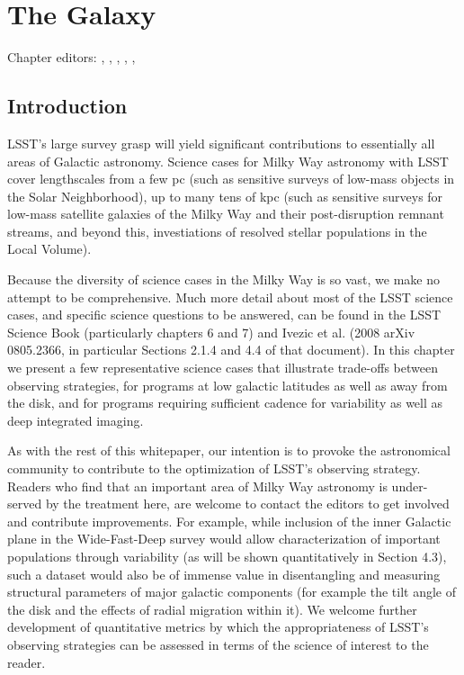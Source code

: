 
\chapter{The Galaxy}
\def\chpname{galaxy}\label{chp:\chpname}

Chapter editors:
,
,
,
,
,



\section{Introduction}
\def\secname{MW_Intro}\label{sec:\secname}

LSST's large survey grasp will yield significant contributions to
essentially all areas of Galactic astronomy. Science cases for Milky
Way astronomy with LSST cover lengthscales from a few pc (such as
sensitive surveys of low-mass objects in the Solar Neighborhood), up
to many tens of kpc (such as sensitive surveys for low-mass satellite
galaxies of the Milky Way and their post-disruption remnant streams,
and beyond this, investiations of resolved stellar populations in the
Local Volume). 

Because the diversity of science cases in the Milky Way is so vast, we
make no attempt to be comprehensive. Much more detail about most of
the LSST science cases, and specific science questions to be answered,
can be found in the LSST Science Book (particularly chapters 6 and 7)
and Ivezic et al. (2008 arXiv 0805.2366, in particular Sections 2.1.4
and 4.4 of that document). In this chapter we present a few
representative science cases that illustrate trade-offs between
observing strategies, for programs at low galactic latitudes as well
as away from the disk, and for programs requiring sufficient cadence
for variability as well as deep integrated imaging. 

As with the rest of this whitepaper, our intention is to provoke the
astronomical community to contribute to the optimization of LSST's
observing strategy. Readers who find that an important area of Milky
Way astronomy is under-served by the treatment here, are welcome to
contact the editors to get involved and contribute improvements. For
example, while inclusion of the inner Galactic plane in the
Wide-Fast-Deep survey would allow characterization of important
populations through variability (as will be shown quantitatively in
Section 4.3), such a dataset would also be of immense value in
disentangling and measuring structural parameters of major galactic
components (for example the tilt angle of the disk and the effects of
radial migration within it). We welcome further development of
quantitative metrics by which the appropriateness of LSST's observing
strategies can be assessed in terms of the science of interest to the
reader.

